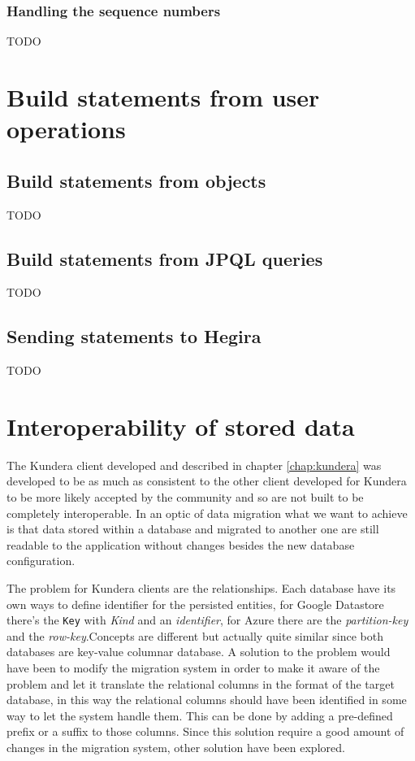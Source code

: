 \subsubsection{Handling the sequence numbers}
TODO

\section{Build statements from user operations}
\label{sec:statements}
\subsection{Build statements from objects}
TODO
\subsection{Build statements from JPQL queries}
TODO
\subsection{Sending statements to Hegira}
TODO

\section{Interoperability of stored data}
The Kundera client developed and described in chapter \ref{chap:kundera} was developed to be as much as consistent to the other client developed for Kundera to be more likely accepted by the community and so are not built to be completely interoperable.
In an optic of data migration what we want to achieve is that data stored within a database and migrated to another one are still readable to the application without changes besides the new database configuration. 

\noindent The problem for Kundera clients are the relationships. Each database have its own ways to define identifier for the persisted entities, for Google Datastore there's the \texttt{Key} with \textit{Kind} and an \textit{identifier}, for Azure there are the \textit{partition-key} and the \textit{row-key}.Concepts are different but actually quite similar since both databases are key-value columnar database. 
A solution to the problem would have been to modify the migration system in order to make it aware of the problem and let it translate the relational columns in the format of the target database, in this way the relational columns should have been identified in some way to let the system handle them. This can be done by adding a pre-defined prefix or a suffix to those columns.
Since this solution require a good amount of changes in the migration system, other solution have been explored.
 
